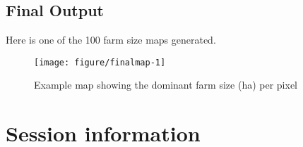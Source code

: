 \documentclass{article}\usepackage[]{graphicx}\usepackage[]{xcolor}
\newenvironment{knitrout}{}{} %
\begin{document}
\newpage
\subsection{Final Output}

Here is one of the 100 farm size maps generated.

\begin{knitrout}\footnotesize
{}\color{fgcolor}\begin{figure}[H]

{\centering \texttt{[image: figure/finalmap-1]} 

}

\caption[Example map showing the dominant farm size (ha) per pixel]{Example map showing the dominant farm size (ha) per pixel}\label{fig:finalmap}
\end{figure}

\end{knitrout}

\newpage
\section*{Session information}
\end{document}
